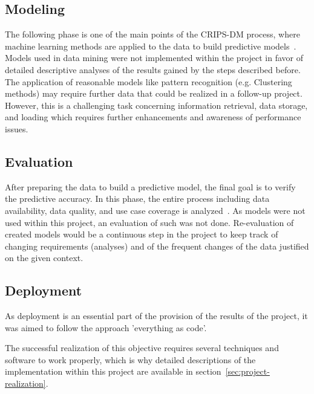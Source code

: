 \subsection{Modeling}\label{subsec:modeling}
The following phase is one of the main points of the CRIPS-DM process, where machine learning methods are applied to the data to build predictive models~\autocite[cf.][]{Semmelmann.2020}.
Models used in data mining were not implemented within the project in favor of detailed descriptive analyses of the results gained by the steps described before.
The application of reasonable models like pattern recognition (e.g. Clustering methods) may require further data that could be realized in a follow-up project.
However, this is a challenging task concerning information retrieval, data storage, and loading which requires further enhancements and awareness of performance issues.



\subsection{Evaluation}\label{subsec:evaluation}
After preparing the data to build a predictive model, the final goal is to verify the predictive accuracy.
In this phase, the entire process including data availability, data quality, and use case coverage is analyzed~\autocite[cf.][]{Semmelmann.2020}.
As models were not used within this project, an evaluation of such was not done.
Re-evaluation of created models would be a continuous step in the project to keep track of changing requirements (analyses) and of the frequent changes of the data justified on the given context.


\subsection{Deployment}\label{subsec:deployment}
As deployment is an essential part of the provision of the results of the project, it was aimed to follow the approach 'everything as code'.

The successful realization of this objective requires several techniques and software to work properly, which is why detailed descriptions of the implementation within this project are available in section~\ref{sec:project-realization}.
